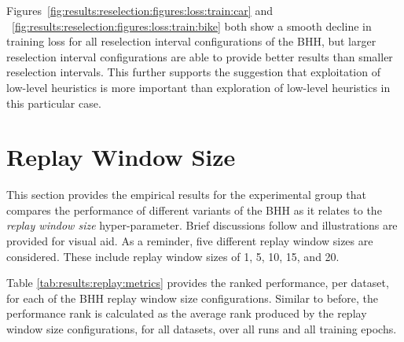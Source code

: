 Figures~\ref{fig:results:reselection:figures:loss:train:car} and ~\ref{fig:results:reselection:figures:loss:train:bike} both show a smooth decline in training loss for all reselection interval configurations of the \acs{BHH}, but larger reselection interval configurations are able to provide better results than smaller reselection intervals. This further supports the suggestion that exploitation of low-level heuristics is more important than exploration of low-level heuristics in this particular case.

\section{Replay Window Size}\label{sec:results:replay}

This section provides the empirical results for the experimental group that compares the performance of different variants of the \acs{BHH} as it relates to the \textit{replay window size} hyper-parameter. Brief discussions follow and illustrations are provided for visual aid. As a reminder, five different replay window sizes are considered. These include replay window sizes of 1, 5, 10, 15, and 20.

Table \ref{tab:results:replay:metrics} provides the ranked performance, per dataset, for each of the \acs{BHH} replay window size configurations. Similar to before, the performance rank is calculated as the average rank produced by the replay window size configurations, for all datasets, over all runs and all training epochs.

